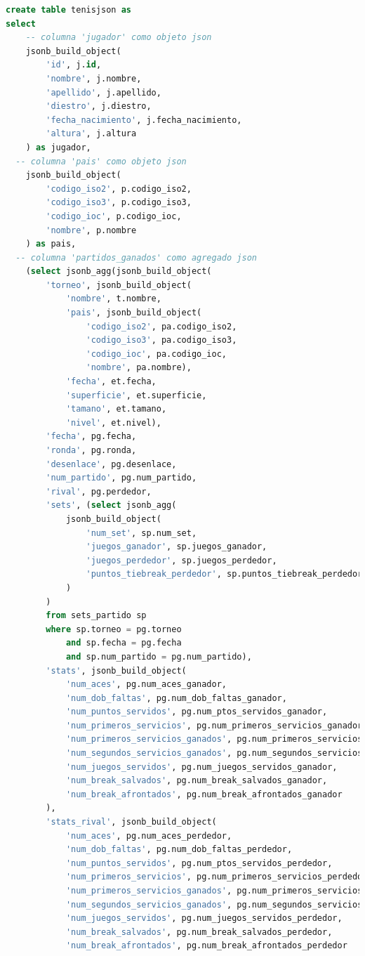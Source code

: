 \documentclass[10pt]{opticajnl}
\begin{document}
\begin{lstlisting}[language=SQL]
create table tenisjson as
select 
	-- columna 'jugador' como objeto json
	jsonb_build_object(
		'id', j.id, 
		'nombre', j.nombre, 
		'apellido', j.apellido, 
		'diestro', j.diestro, 
		'fecha_nacimiento', j.fecha_nacimiento, 
		'altura', j.altura
	) as jugador,
  -- columna 'pais' como objeto json
	jsonb_build_object(
		'codigo_iso2', p.codigo_iso2, 
		'codigo_iso3', p.codigo_iso3, 
		'codigo_ioc', p.codigo_ioc, 
		'nombre', p.nombre
	) as pais,
  -- columna 'partidos_ganados' como agregado json
	(select jsonb_agg(jsonb_build_object(
		'torneo', jsonb_build_object(
			'nombre', t.nombre, 
			'pais', jsonb_build_object(
				'codigo_iso2', pa.codigo_iso2, 
				'codigo_iso3', pa.codigo_iso3, 
				'codigo_ioc', pa.codigo_ioc, 
				'nombre', pa.nombre), 
			'fecha', et.fecha, 
			'superficie', et.superficie, 
			'tamano', et.tamano, 
			'nivel', et.nivel), 
		'fecha', pg.fecha, 
		'ronda', pg.ronda, 
		'desenlace', pg.desenlace, 
		'num_partido', pg.num_partido, 
		'rival', pg.perdedor, 
		'sets', (select jsonb_agg(
			jsonb_build_object(
				'num_set', sp.num_set, 
				'juegos_ganador', sp.juegos_ganador, 
				'juegos_perdedor', sp.juegos_perdedor, 
				'puntos_tiebreak_perdedor', sp.puntos_tiebreak_perdedor
			)
		) 
		from sets_partido sp 
		where sp.torneo = pg.torneo 
			and sp.fecha = pg.fecha 
			and sp.num_partido = pg.num_partido), 
		'stats', jsonb_build_object(
			'num_aces', pg.num_aces_ganador, 
			'num_dob_faltas', pg.num_dob_faltas_ganador, 
			'num_puntos_servidos', pg.num_ptos_servidos_ganador, 
			'num_primeros_servicios', pg.num_primeros_servicios_ganador, 
			'num_primeros_servicios_ganados', pg.num_primeros_servicios_ganados_ganador, 
			'num_segundos_servicios_ganados', pg.num_segundos_servicios_ganados_ganador, 
			'num_juegos_servidos', pg.num_juegos_servidos_ganador, 
			'num_break_salvados', pg.num_break_salvados_ganador, 
			'num_break_afrontados', pg.num_break_afrontados_ganador
		), 
		'stats_rival', jsonb_build_object(
			'num_aces', pg.num_aces_perdedor, 
			'num_dob_faltas', pg.num_dob_faltas_perdedor, 
			'num_puntos_servidos', pg.num_ptos_servidos_perdedor, 
			'num_primeros_servicios', pg.num_primeros_servicios_perdedor, 
			'num_primeros_servicios_ganados', pg.num_primeros_servicios_ganados_perdedor, 
			'num_segundos_servicios_ganados', pg.num_segundos_servicios_ganados_perdedor, 
			'num_juegos_servidos', pg.num_juegos_servidos_perdedor, 
			'num_break_salvados', pg.num_break_salvados_perdedor, 
			'num_break_afrontados', pg.num_break_afrontados_perdedor

\end{lstlisting}
\end{document}
